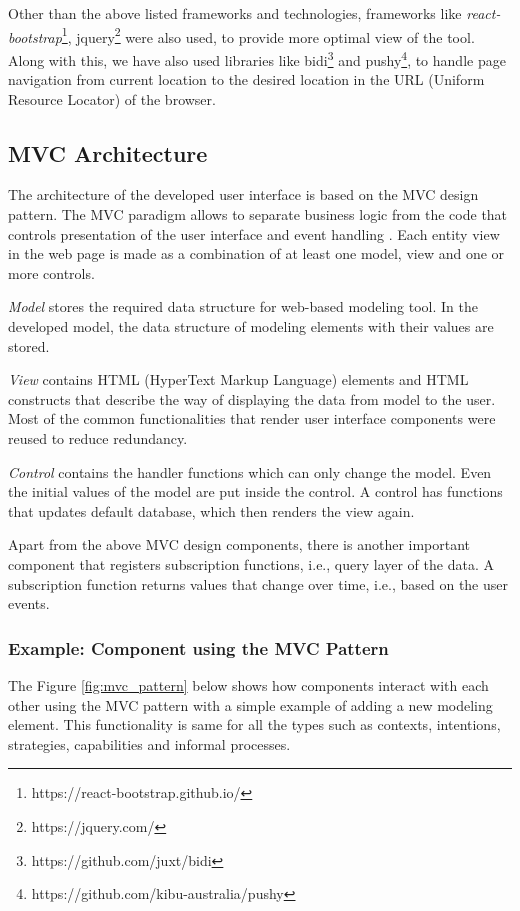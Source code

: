 Other than the above listed frameworks and technologies, frameworks like \textit{react-bootstrap}\footnote{https://react-bootstrap.github.io/}, jquery\footnote{https://jquery.com/} were also used, to provide more optimal view of the tool. Along with this, we have also used libraries like bidi\footnote{https://github.com/juxt/bidi} and pushy\footnote{https://github.com/kibu-australia/pushy}, to handle page navigation from current location to the desired location in the URL (Uniform Resource Locator) of the browser. 

\subsection{MVC Architecture}
\label{subsec:mvcarch}
The architecture of the developed user interface is based on the MVC design pattern. The MVC paradigm allows to separate business logic from the code that controls presentation of the user interface and event handling \cite{Oracle2016}. Each entity view in the web page is made as a combination of at least one model, view and one or more controls. 

\textit{Model} stores the required data structure for web-based modeling tool. In the developed model, the data structure of modeling elements with their values are stored. 

\textit{View} contains HTML (HyperText Markup Language) elements and HTML constructs that describe the way of displaying the data from model to the user. Most of the common functionalities that render user interface components were reused to reduce redundancy. 

\textit{Control} contains the handler functions which can only change the model. Even the initial values of the model are put inside the control. A control has functions that updates default database, which then renders the view again. 

Apart from the above MVC design components, there is another important component that registers subscription functions, i.e., query layer of the data. A subscription function returns values that change over time, i.e., based on the user events.

\subsubsection{Example: Component using the MVC Pattern }
The Figure \ref{fig:mvc_pattern} below shows how components interact with each other using the MVC pattern with a simple example of adding a new modeling element. This functionality is same for all the types such as contexts, intentions, strategies, capabilities and informal processes.  

